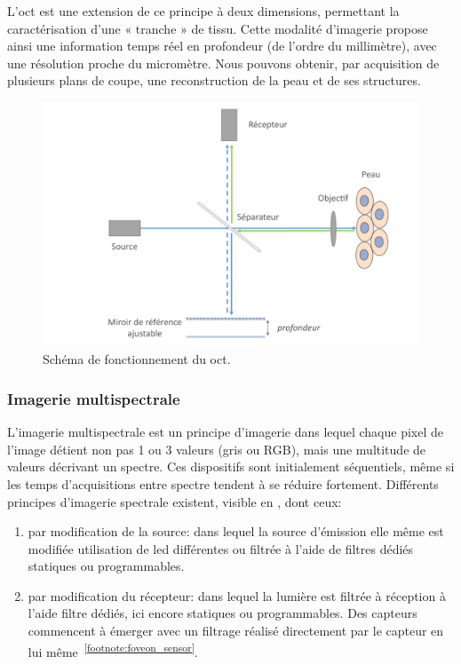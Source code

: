 L’\gls{oct} est une extension de ce principe à deux dimensions, permettant la caractérisation d’une « tranche » de tissu. Cette modalité d’imagerie propose ainsi une information temps réel en profondeur (de l’ordre du millimètre), avec une résolution proche du micromètre. Nous pouvons obtenir, par acquisition de plusieurs plans de coupe, une reconstruction de la peau et de ses structures.\par

\begin{figure}[H]
    \centering
    \includegraphics[width=0.8\linewidth]{contents/chapter_2/resources/oct_principle.pdf}
    \caption{Schéma de fonctionnement du \gls{oct}.}
    \label{fig:oct_principle}
\end{figure}\par

\subsubsection{Imagerie multispectrale}
L'imagerie multispectrale est un principe d'imagerie dans lequel chaque pixel de l'image détient non pas 1 ou 3 valeurs (gris ou RGB), mais une multitude de valeurs décrivant un spectre. Ces dispositifs sont initialement séquentiels, même si les temps d'acquisitions entre spectre tendent à se réduire fortement. Différents principes d'imagerie spectrale existent, visible en , dont ceux:
\begin{enumerate}
\item par modification de la source: dans lequel la source d'émission elle même est modifiée utilisation de \gls{led} différentes ou filtrée à l'aide de filtres dédiés statiques ou programmables.
\item par modification du récepteur: dans lequel la lumière est filtrée à réception à l'aide filtre dédiés, ici encore statiques ou programmables. Des capteurs commencent à émerger avec un filtrage réalisé directement par le capteur en lui même~\textsuperscript{\ref{footnote:foveon_sensor}}.
\end{enumerate}\par

